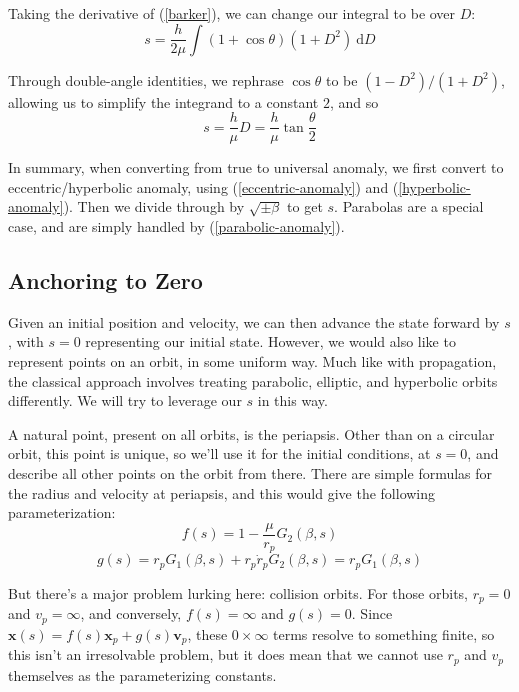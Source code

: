\documentclass{article}
\newcommand{\dd}{\mathrm{d}}
\numberwithin{equation}{subsection}
\begin{document}
Taking the derivative of (\ref{barker}), we can change our integral to be over $D$:
\begin{equation}
s = \frac{h}{2 \mu} \int (1 + \cos \theta)(1 + D^2)~\dd D
\end{equation}

Through double-angle identities, we rephrase $\cos \theta$ to be $(1 - D^2)/(1 + D^2)$, allowing us to simplify the integrand to a constant $2$, and so
\begin{equation}
\label{parabolic-anomaly}
s = \frac{h}{\mu} D = \frac{h}{\mu} \tan \frac{\theta}{2}
\end{equation}

In summary, when converting from true to universal anomaly, we first convert to eccentric/hyperbolic anomaly, using (\ref{eccentric-anomaly}) and (\ref{hyperbolic-anomaly}). Then we divide through by $\sqrt{\pm \beta}$ to get $s$. Parabolas are a special case, and are simply handled by (\ref{parabolic-anomaly}).

\subsection*{Anchoring to Zero}

Given an initial position and velocity, we can then advance the state forward by $s$, with $s = 0$ representing our initial state. However, we would also like to represent points on an orbit, in some uniform way. Much like with propagation, the classical approach involves treating parabolic, elliptic, and hyperbolic orbits differently. We will try to leverage our $s$ in this way.

A natural point, present on all orbits, is the periapsis. Other than on a circular orbit, this point is unique, so we'll use it for the initial conditions, at $s = 0$, and describe all other points on the orbit from there. There are simple formulas for the radius and velocity at periapsis, and this would give the following parameterization:
\[ f(s) = 1 - \frac{\mu}{r_p} G_2(\beta, s) \]
\[ g(s) = r_p G_1(\beta, s) + r_p \dot r_p G_2(\beta, s) = r_p G_1(\beta, s) \]

But there's a major problem lurking here: collision orbits. For those orbits, $r_p = 0$ and $v_p = \infty$, and conversely, $f(s) = \infty$ and $g(s) = 0$. Since $\bm x(s) = f(s) \bm x_p + g(s) \bm v_p$, these $0 \times \infty$ terms resolve to something finite, so this isn't an irresolvable problem, but it does mean that we cannot use $r_p$ and $v_p$ themselves as the parameterizing constants.
\end{document}
